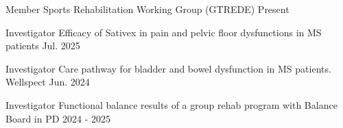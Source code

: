 

\begin{cventries}
  \cventry
    {Member} %
    {Sports Rehabilitation Working Group (GTREDE)} %
    {} %
    {Present} %
    {}

  \cventry
    {Investigator} %
    {Efficacy of Sativex in pain and pelvic floor dysfunctions in MS patients} %
    {} %
    {Jul. 2025} %
    {}

  \cventry
    {Investigator} %
    {Care pathway for bladder and bowel dysfunction in MS patients. Wellspect} %
    {} %
    {Jun. 2024} %
    {}

  \cventry
    {Investigator} %
    {Functional balance results of a group rehab program with Balance Board in PD} %
    {} %
    {2024 - 2025} %
    {}
\end{cventries}
